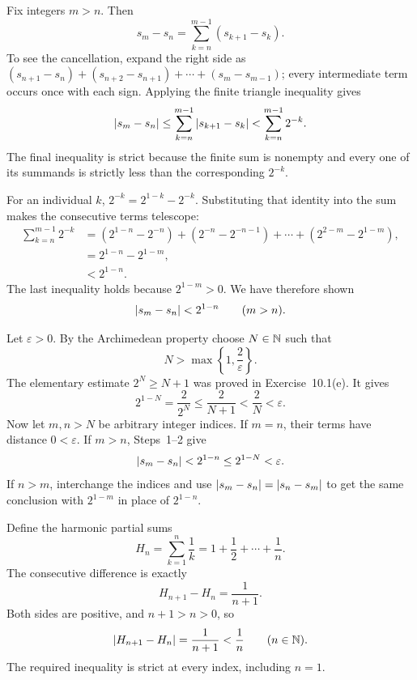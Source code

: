 Fix integers $m>n$. Then
\[
 s_m-s_n=\sum_{k=n}^{m-1}(s_{k+1}-s_k).
\]
To see the cancellation, expand the right side as
$(s_{n+1}-s_n)+(s_{n+2}-s_{n+1})+\cdots+(s_m-s_{m-1})$;
every intermediate term occurs once with each sign. Applying the
finite triangle inequality gives
\[
 \left|s_m-s_n\right|
   \le\sum_{k=n}^{m-1}\left|s_{k+1}-s_k\right|
   <\sum_{k=n}^{m-1}2^{-k}.
\]
The final inequality is strict because the finite sum is nonempty
and every one of its summands is strictly less than the corresponding
$2^{-k}$.

For an individual $k$,
$2^{-k}=2^{1-k}-2^{-k}$. Substituting that identity into the sum
makes the consecutive terms telescope:
\begin{align*}
 \sum_{k=n}^{m-1}2^{-k}
   &=(2^{1-n}-2^{-n})+(2^{-n}-2^{-n-1})
       +\cdots+(2^{2-m}-2^{1-m}),\\
   &=2^{1-n}-2^{1-m},\\
   &<2^{1-n}.
\end{align*}
The last inequality holds because $2^{1-m}>0$.
We have therefore shown
\[
 \left|s_m-s_n\right|<2^{1-n}\qquad(m>n).
\]

Let $\varepsilon>0$. By the Archimedean property choose
$N\in\mathbb{N}$ such that
\[
 N>\max\left\{1,\frac2\varepsilon\right\}.
\]
The elementary estimate $2^N\ge N+1$ was proved in Exercise~10.1(e).
It gives
\[
 2^{1-N}=\frac2{2^N}\le\frac2{N+1}<\frac2N<\varepsilon.
\]
Now let $m,n>N$ be arbitrary integer indices.
If $m=n$, their terms have distance $0<\varepsilon$.
If $m>n$, Steps~1--2 give
\[
 \left|s_m-s_n\right|<2^{1-n}\le2^{1-N}<\varepsilon.
\]
If $n>m$, interchange the indices and use
$\left|s_m-s_n\right|=\left|s_n-s_m\right|$ to get the same conclusion with
$2^{1-m}$ in place of $2^{1-n}$.


Define the harmonic partial sums
\[
 H_n=\sum_{k=1}^{n}\frac1k
   =1+\frac12+\cdots+\frac1n.
\]
The consecutive difference is exactly
\[
 H_{n+1}-H_n=\frac1{n+1}.
\]
Both sides are positive, and $n+1>n>0$, so
\[
 \left|H_{n+1}-H_n\right|=\frac1{n+1}<\frac1n
 \qquad(n\in\mathbb{N}).
\]
The required inequality is strict at every index, including $n=1$.

